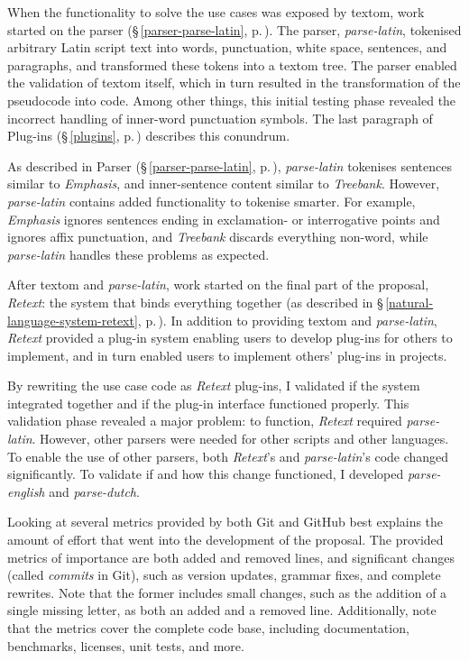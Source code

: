 When the functionality to solve the use cases was exposed by \gls{textom},
  work started on the parser (§\,\ref{parser-parse-latin},
  p.\,\pageref{parser-parse-latin}).
The parser, \emph{parse-latin}, tokenised arbitrary Latin script text into
  words, punctuation, white space, sentences, and paragraphs, and transformed
  these tokens into a \gls{textom} tree.
The parser enabled the validation of \gls{textom} itself, which in turn
  resulted in the transformation of the pseudocode into code.
Among other things, this initial testing phase revealed the incorrect
  handling of inner-word punctuation symbols.
The last paragraph of Plug-ins (§\,\ref{plugins}, p.\,\pageref{plugins})
  describes this conundrum.

As described in Parser (§\,\ref{parser-parse-latin},
  p.\,\pageref{parser-parse-latin}), \emph{parse-latin} tokenises sentences
  similar to \emph{Emphasis}, and inner-sentence content similar to
  \emph{Treebank}.
However, \emph{parse-latin} contains added functionality to tokenise smarter.
For example, \emph{Emphasis} ignores sentences ending in exclamation- or
  interrogative points and ignores affix punctuation, and \emph{Treebank}
  discards everything non-word, while \emph{parse-latin} handles these
  problems as expected.

After \gls{textom} and \emph{parse-latin}, work started on the final
  part of the proposal, \emph{Retext}: the system that binds everything
  together (as described in §\,\ref{natural-language-system-retext},
  p.\,\pageref{natural-language-system-retext}).
In addition to providing \gls{textom} and \emph{parse-latin}, \emph{Retext}
  provided a plug-in system enabling users to develop plug-ins for others
  to implement, and in turn enabled users to implement others' plug-ins
  in projects.

By rewriting the use case code as \emph{Retext} plug-ins, I validated if
  the system integrated together and if the plug-in interface functioned
  properly.
This validation phase revealed a major problem: to function, \emph{Retext}
  required \emph{parse-latin}.
However, other parsers were needed for other scripts and other languages.
To enable the use of other parsers, both \emph{Retext}'s and
  \emph{parse-latin}'s code changed significantly.
To validate if and how this change functioned, I developed
  \emph{parse-english} and \emph{parse-dutch}.

\medskip\noindent Looking at several metrics provided by both Git and
  GitHub best explains the amount of effort that went into the development
  of the proposal.
The provided metrics of importance are both added and removed lines, and
  significant changes (called \emph{commits} in Git), such as version
  updates, grammar fixes, and complete rewrites.
Note that the former includes small changes, such as the addition of a single
  missing letter, as both an added and a removed line.
Additionally, note that the metrics cover the complete code base, including
  documentation, benchmarks, licenses, unit tests, and more.

